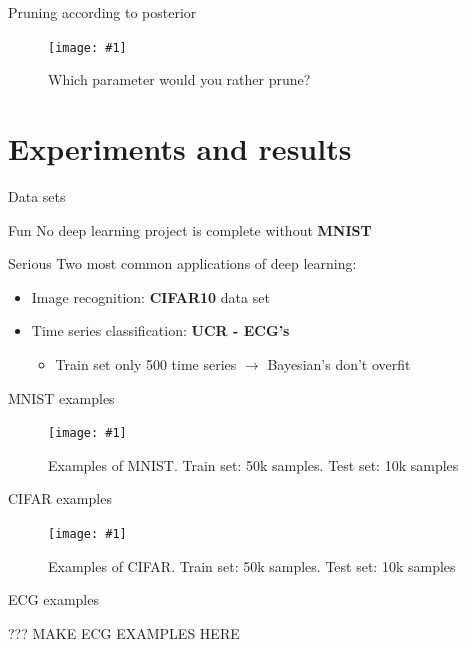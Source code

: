 \documentclass{beamer}
\newcommand{\fitfigure}[1]{\centering\texttt{[image: \#1]}}
\begin{document}
\begin{frame}{Pruning according to posterior}
	\begin{figure}
		\fitfigure{/home/rob/Dropbox/ml_projects/weight_uncertainty/weight_uncertainty/im/two_distro_pruning.png}
		\caption{Which parameter would you rather prune?}
	\end{figure}
\end{frame}

\section{Experiments and results}
\begin{frame}{Data sets}
	\begin{block}{Fun}
		No deep learning project is complete without \textbf{MNIST}
	\end{block}
		
	\begin{block}{Serious}
		Two most common applications of deep learning:
				
		\begin{itemize}
			\item Image recognition: \textbf{CIFAR10} data set
			\item Time series classification: \textbf{UCR - ECG's}
			      \begin{itemize}
			      	\item Train set only 500 time series $\rightarrow$ Bayesian's don't overfit
			      \end{itemize}
		\end{itemize}
	\end{block}
\end{frame}

\begin{frame}{MNIST examples}
	\begin{figure}
		\fitfigure{im/mnist_examples.png}
		\caption{Examples of MNIST. Train set: 50k samples. Test set: 10k samples}
	\end{figure}
\end{frame}

\begin{frame}{CIFAR examples}
	\begin{figure}
		\fitfigure{im/cifar_examples.png}
		\caption{Examples of CIFAR. Train set: 50k samples. Test set: 10k samples}
	\end{figure}
\end{frame}

\begin{frame}{ECG examples}
	\centerline{??? MAKE ECG EXAMPLES HERE}
\end{frame}
\end{document}
